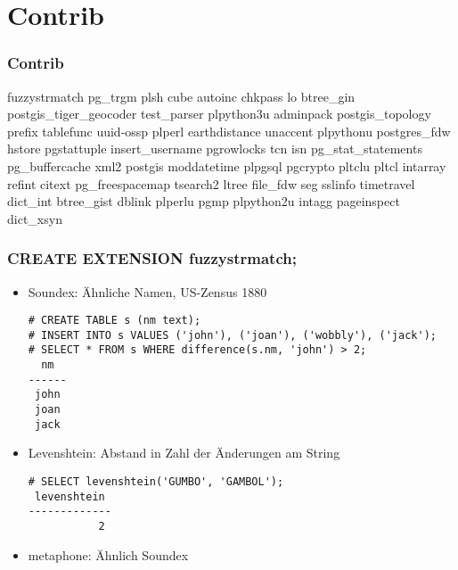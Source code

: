 \documentclass[utf8,hyperref={pdftex,colorlinks,linkcolor=black,citecolor=black,urlcolor=black,filecolor=black,plainpages=false},xcolor=table,hyperref]{beamer}
\begin{document}

%
%
%

\section{Contrib}

\begin{frame}
	\frametitle{Contrib}
fuzzystrmatch pg_trgm plsh cube autoinc chkpass lo btree_gin
postgis_tiger_geocoder test_parser plpython3u adminpack postgis_topology prefix
tablefunc uuid-ossp plperl earthdistance unaccent plpythonu postgres_fdw hstore
pgstattuple insert_username pgrowlocks tcn isn pg_stat_statements
pg_buffercache xml2 postgis moddatetime plpgsql pgcrypto pltclu pltcl intarray
refint citext pg_freespacemap tsearch2 ltree file_fdw seg sslinfo timetravel
dict_int btree_gist dblink plperlu pgmp plpython2u intagg pageinspect dict_xsyn
\end{frame}


\begin{frame}[containsverbatim]
	\frametitle{CREATE EXTENSION fuzzystrmatch;}
	\begin{itemize}
		\item Soundex: Ähnliche Namen, US-Zensus 1880
			{\footnotesize
		\begin{verbatim}
# CREATE TABLE s (nm text);
# INSERT INTO s VALUES ('john'), ('joan'), ('wobbly'), ('jack');
# SELECT * FROM s WHERE difference(s.nm, 'john') > 2;
  nm  
------
 john
 joan
 jack
			  \end{verbatim}}
		  \item Levenshtein: Abstand in Zahl der Änderungen am String
			  {\footnotesize
			  \begin{verbatim}
# SELECT levenshtein('GUMBO', 'GAMBOL');
 levenshtein
-------------
           2
	   \end{verbatim}}
   \item metaphone: Ähnlich Soundex
	  \end{itemize}

\end{frame}
\end{document}
